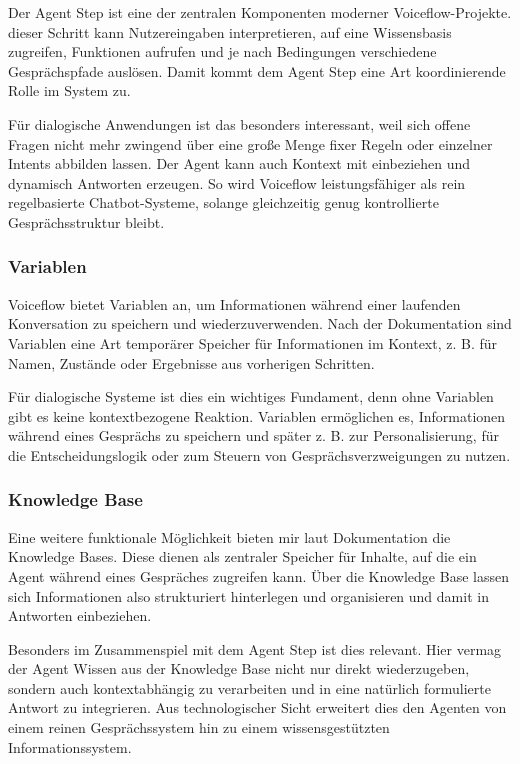 Der Agent Step ist eine der zentralen Komponenten moderner Voiceflow-Projekte.
dieser Schritt kann Nutzereingaben interpretieren, auf eine
Wissensbasis zugreifen, Funktionen aufrufen und je nach Bedingungen verschiedene 
Gesprächspfade auslösen. Damit kommt dem Agent Step eine Art koordinierende Rolle 
im System zu.

Für dialogische Anwendungen ist das besonders interessant, weil sich offene 
Fragen nicht mehr zwingend über eine große Menge fixer Regeln oder einzelner 
Intents abbilden lassen. Der Agent kann auch Kontext mit einbeziehen und 
dynamisch Antworten erzeugen. So wird Voiceflow leistungsfähiger als rein 
regelbasierte Chatbot-Systeme, solange gleichzeitig genug kontrollierte 
Gesprächsstruktur bleibt.

\subsubsection{Variablen}

Voiceflow bietet Variablen an, um Informationen während einer laufenden 
Konversation zu speichern und wiederzuverwenden.
Nach der Dokumentation sind Variablen eine Art temporärer Speicher für 
Informationen im Kontext, z. B. für Namen, Zustände oder Ergebnisse aus 
vorherigen Schritten.

Für dialogische Systeme ist dies ein wichtiges Fundament, denn ohne Variablen 
gibt es keine kontextbezogene Reaktion. Variablen ermöglichen es, Informationen 
während eines Gesprächs zu speichern und später z. B. zur Personalisierung, für 
die Entscheidungslogik oder zum Steuern von Gesprächsverzweigungen zu nutzen.

\subsubsection{Knowledge Base}

Eine weitere funktionale Möglichkeit bieten mir laut Dokumentation die Knowledge
Bases. Diese dienen als zentraler Speicher für Inhalte, auf die ein Agent während 
eines Gespräches zugreifen kann. Über die Knowledge Base lassen sich Informationen 
also strukturiert hinterlegen und organisieren und damit in Antworten einbeziehen.

Besonders im Zusammenspiel mit dem Agent Step ist dies relevant. Hier vermag der 
Agent Wissen aus der Knowledge Base nicht nur direkt wiederzugeben, sondern auch 
kontextabhängig zu verarbeiten und in eine natürlich formulierte Antwort zu 
integrieren. Aus technologischer Sicht erweitert dies den Agenten von einem 
reinen Gesprächssystem hin zu einem wissensgestützten Informationssystem.

